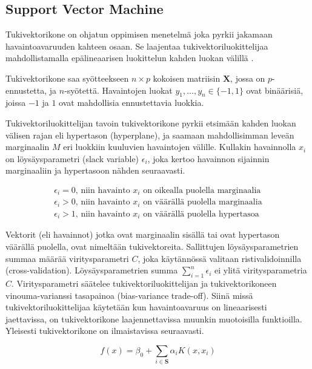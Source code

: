\documentclass[finnish,twoside,openright]{HYgraduMLDS}
\begin{document}
\subsection{Support Vector Machine}

Tukivektorikone on ohjatun oppimisen menetelmä joka pyrkii jakamaan havaintoavaruuden kahteen osaan. Se laajentaa tukivektoriluokittelijaa mahdollistamalla epälineaarisen luokittelun kahden luokan välillä \cite{james2013ISLR}.

Tukivektorikone saa syötteekseen $n \times p$ kokoisen matriisin $\textbf{X}$, jossa on $p$-ennustetta, ja $n$-syötettä. Havaintojen luokat $y_1, \dots, y_n \in \{-1, 1\}$ ovat binäärisiä, joissa $-1$ ja $1$ ovat mahdollisia ennustettavia luokkia. 

Tukivektoriluokittelijan tavoin tukivektorikone pyrkii etsimään kahden luokan välisen rajan eli hypertason (hyperplane), ja saamaan mahdollisimman leveän marginaalin $M$ eri luokkiin kuuluvien havaintojen välille. Kullakin havainnolla $x_i$ on löysäysparametri (slack variable) $\epsilon_i$, joka kertoo havainnon sijainnin marginaaliin ja hypertasoon nähden seuraavasti. 

\begin{gather}
    \epsilon_i = 0\text{, niin havainto $x_i$ on oikealla puolella marginaalia}\\
    \epsilon_i > 0\text{, niin havainto $x_i$ on väärällä puolella marginaalia}\\
    \epsilon_i > 1\text{, niin havainto $x_i$ on väärällä puolella hypertasoa}
\end{gather}

Vektorit (eli havainnot) jotka ovat marginaalin sisällä tai ovat hypertason väärällä puolella, ovat nimeltään tukivektoreita. Sallittujen löysäysparametrien summaa määrää viritysparametri $C$, joka käytännössä valitaan ristivalidoinnilla (cross-validation). Löysäysparametrien summa $\sum^n_{i=1} \epsilon_i$ ei ylitä viritysparametria $C$. Viritysparametri säätelee tukivektoriluokittelijan ja tukivektorikoneen vinouma-varianssi tasapainoa (bias-variance trade-off). Siinä missä tukivektoriluokittelijaa käytetään kun havaintoavaruus on lineaarisesti jaettavissa, on tukivektorikone laajennettavissa muunkin muotoisilla funktioilla. Yleisesti tukivektorikone on ilmaistavissa seuraavasti.

\begin{equation}
    f(x) = \beta_0 + \sum_{i \in \textbf{S}} \alpha_i K(x, x_i)
\end{equation}
\end{document}
